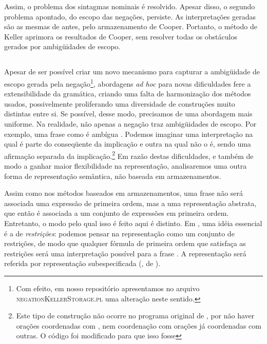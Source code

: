 Assim, o problema dos sintagmas nominais é resolvido. Apesar disso, o segundo problema apontado, do escopo das negações, persiste. As interpretações geradas são as mesmas de antes, pelo armazenamento de Cooper.  Portanto, o método de Keller aprimora os resultados de Cooper, sem resolver todas os obstáculos gerados por ambigüidades de escopo.

\subsection{}

Apesar de ser possível criar um novo mecanismo para capturar a ambigüidade de escopo gerada pela negação\footnote{Com efeito, em nosso repositório apresentamos no arquivo \textsc{negationKellerStorage.pl} uma alteração neste sentido. }, abordagens \textit{ad hoc} para novas dificuldades fere a extensibilidade da gramática, criando uma falta de harmonização dos métodos usados, possivelmente proliferando uma diversidade de construções muito distintas entre si. Se possível, desse modo, precisamos de uma abordagem mais uniforme. Na realidade, não apenas a negação traz ambigüidades de escopo. Por exemplo, uma frase como  é ambígua \citep{HoleSem}. Podemos imaginar uma interpretação na qual  é parte do conseqüente da implicação e outra na qual não o é, sendo uma afirmação separada da implicação.\footnote{Este tipo de construção não ocorre no programa original de \citet{BlackburnBos:2005}, por não haver orações coordenadas com , nem coordenação com orações já coordenadas com outras. O código foi modificado para que isso fosse} Em razão destas dificuldades, e também de modo a ganhar maior flexibilidade na representação, analisaremos uma outra forma de representação semântica, não baseada em armazenamentos. 

Assim como nos métodos baseados em armazenamentos, uma frase não será associada uma expressão de primeira ordem, mas a uma representação abstrata, que então é associada a um conjunto de expressões em primeira ordem. Entretanto, o modo pelo qual isso é feito aqui é distinto. Em , uma idéia essencial é a de \textit{restrições}: podemos pensar na representação como um conjunto de restrições, de modo que qualquer fórmula de primeira ordem que satisfaça as restrições será uma interpretação possível para a frase \cite[p.~129]{BlackburnBos:2005}. A representação será referida por representação subespecificada (, de ).

